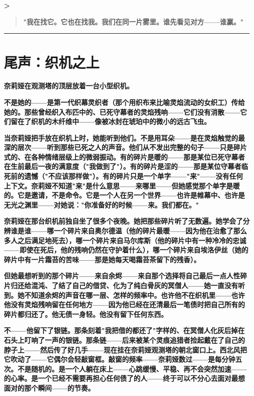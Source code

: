 \documentclass[12pt,a4paper,openany]{ctexbook}
\begin{document}
\textbf{>}

\begin{quote}
\textbf{"我在找它。它也在找我。我们在同一片雾里。谁先看见对方——谁赢。"}

\end{quote}


\bigskip\hrule\bigskip


\chapter{尾声：织机之上}


\textbf{奈莉娅在观测塔的顶层放着一台小型织机。}


\textbf{不是她的——是第一代织幕灵织者（那个用织布来比喻灵焰流动的女织工）传给她的。那些曾经织入布匹中的、已死守幕者的灵焰残响——它们没有消散——它们留在了织机的木纤维中——像被冰封在琥珀中的微小的远古飞虫。}


\textbf{当奈莉娅把手放在织机上时，她能听到他们。不是用耳朵——是在灵焰触觉的最深的层次——听到那些已死之人的声音。他们从不发出完整的句子——只是碎片式的、在各种情绪层级上的微弱振动。有的碎片是暖的——那是某位已死守幕者在生前最后一夜的满意度（"我做到了"）。有的碎片是涩的——那是某位守幕者临死前的遗憾（"不应该那样做"）。有的碎片只是一个单字——"来"——没有任何上下文。奈莉娅不知道"来"是什么意思——来哪里——但她感觉那个单字是暖的。它是邀请，不是命令。它是一个人在另一个世界——也许是帷幕中、也许是无光之渊里——对她说："你准备好的时候——来。我们都在。"}


\textbf{奈莉娅在那台织机前独自坐了很多个夜晚。她把那些碎片听了无数遍。她学会了分辨谁是谁——哪一个碎片来自奥尔德温（他的碎片最暖——因为他在治愈了那么多人之后满足地死去），哪一个碎片来自马尔库斯（他的碎片中有一种冷冷的忠诚——即使在死后，他的残响仍然在守护着什么），哪一个碎片来自埃洛伊丝（她的碎片中有一片霜苔的苦味——那是她每天喝霜苔茶留下的残香）。}


\textbf{但她最想听到的那个碎片——来自余烬——来自那个选择将自己最后一点人性碎片归还给混沌、了结了自己的借贷、化为了纯白骨灰的冥僧人——她一直没有听到。她不知道余烬的声音在哪一层、怎样的频率中。也许他不在织机里——也许他没有灵焰残响留在任何地方——因为他已经在还清最后一笔债时把自己所有的碎片都归还了。他无债一身轻。他没有留下任何东西。}


\textbf{不——他留下了银链。那条刻着"我把借的都还了"字样的、在冥僧人化灰后掉在石头上叮响了一声的银链。那条链——后来被某个灵痕追猎者捡起戴在了自己的脖子上——然后传了好几手——现在挂在奈莉娅观测塔的朝北窗口上。西北风把它吹动了——它偶尔会轻敲窗框。敲窗的频率——奈莉娅数过——是每分钟五次。不是随机的。是一个人躺在床上——心跳缓慢、平稳、再不会突然加速——的心率。是一个已经不需要再担心任何债了的人——终于可以不分心去面对最想面对的那个瞬间——的节奏。}
\end{document}
